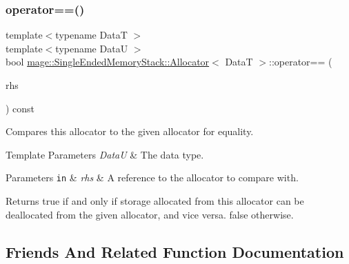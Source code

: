 \subsubsection{\texorpdfstring{operator==()}{operator==()}}
{\footnotesize\ttfamily template$<$typename DataT $>$ \\
template$<$typename DataU $>$ \\
bool \hyperlink{classmage_1_1_single_ended_memory_stack_1_1_allocator}{mage\+::\+Single\+Ended\+Memory\+Stack\+::\+Allocator}$<$ DataT $>$\+::operator== (\begin{DoxyParamCaption}\item[{const \hyperlink{classmage_1_1_single_ended_memory_stack_1_1_allocator}{Allocator}$<$ DataU $>$ \&}]{rhs }\end{DoxyParamCaption}) const\hspace{0.3cm}{\ttfamily [noexcept]}}

Compares this allocator to the given allocator for equality.


\begin{DoxyTemplParams}{Template Parameters}
{\em DataU} & The data type. \\
\hline
\end{DoxyTemplParams}

\begin{DoxyParams}[1]{Parameters}
\mbox{\tt in}  & {\em rhs} & A reference to the allocator to compare with. \\
\hline
\end{DoxyParams}
\begin{DoxyReturn}{Returns}
{\ttfamily true} if and only if storage allocated from this allocator can be deallocated from the given allocator, and vice versa. {\ttfamily false} otherwise. 
\end{DoxyReturn}


\subsection{Friends And Related Function Documentation}
\hypertarget{classmage_1_1_single_ended_memory_stack_1_1_allocator_a3f3449e5c2caa1666a293b36db6f5a54}{}\label{classmage_1_1_single_ended_memory_stack_1_1_allocator_a3f3449e5c2caa1666a293b36db6f5a54} 
